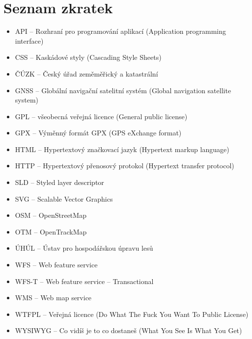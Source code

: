 \documentclass[11pt,a4paper,titlepage,oneside]{book}
\begin{document}
\chapter*{Seznam zkratek}
	\begin{itemize}
		\item API -- Rozhraní pro programování aplikací (Application programming interface)
		\item CSS -- Kaskádové styly (Cascading Style Sheets)
		\item ČÚZK -- Český úřad zeměměřický a katastrální
		\item GNSS -- Globální navigační satelitní systém (Global navigation satellite system)
		\item GPL -- všeobecná veřejná licence (General public license)
		\item GPX -- Výměnný formát GPX (GPS eXchange format)
		\item HTML -- Hypertextový značkovací jazyk (Hypertext markup language)
		\item HTTP -- Hypertextový přenosový protokol (Hypertext transfer protocol)
		\item SLD -- Styled layer descriptor
		\item SVG -- Scalable Vector Graphics
		\item OSM -- OpenStreetMap
		\item OTM -- OpenTrackMap
		\item ÚHÚL -- Ústav pro hospodářskou úpravu lesů
		\item WFS -- Web feature service
		\item WFS-T -- Web feature service -- Transactional
		\item WMS -- Web map service
		\item WTFPL -- Veřejná licence  (Do What The Fuck You Want To Public License)
		\item WYSIWYG -- Co vidíš je to co dostaneš (What You See Is What You Get)
	\end{itemize}
\end{document}
